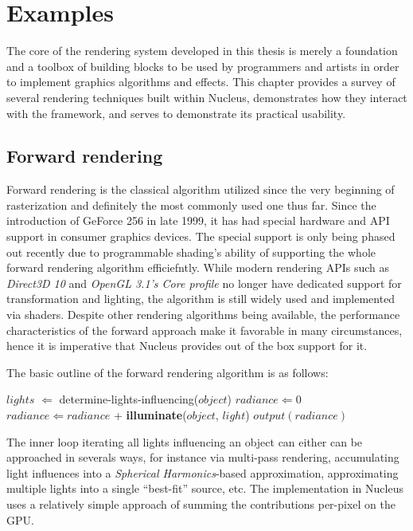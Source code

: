 
\chapter{ Examples }
\label{Chapter6}

The core of the rendering system developed in this thesis is merely a foundation and a toolbox of building blocks to be used by programmers and artists in order to implement graphics algorithms and effects. This chapter provides a survey of several rendering techniques built within Nucleus, demonstrates how they interact with the framework, and serves to demonstrate its practical usability.

\section{Forward rendering}
\label{sec:ForwardRenderingExample}

Forward rendering is the classical algorithm utilized since the very beginning of rasterization and definitely the most commonly used one thus far. Since the introduction of GeForce 256 in late 1999, it has had special hardware and API support in consumer graphics devices. The special support is only being phased out recently due to programmable shading's ability of supporting the whole forward rendering algorithm efficiefntly. While modern rendering APIs such as \emph{Direct3D 10} and \emph{OpenGL 3.1's Core profile} no longer have dedicated support for transformation and lighting, the algorithm is still widely used and implemented via shaders. Despite other rendering algorithms being available, the performance characteristics of the forward approach make it favorable in many circumstances, hence it is imperative that Nucleus provides out of the box support for it.

The basic outline of the forward rendering algorithm is as follows:
	
\begin{algorithmic}
	\STATE $lights$ $\Leftarrow$ determine-lights-influencing($object$)
	\STATE $radiance \Leftarrow 0$
		\STATE $radiance \Leftarrow radiance$ + \textbf{illuminate}($object$, $light$)
	\ENDFOR
	\STATE $output(radiance)$
\ENDFOR
\end{algorithmic}

The inner loop iterating all lights influencing an object can either can be approached in severals ways, for instance via multi-pass rendering, accumulating light influences into a \emph{Spherical Harmonics}-based approximation, approximating multiple lights into a single ``best-fit'' source, etc. The implementation in Nucleus uses a relatively simple approach of summing the contributions per-pixel on the GPU.

